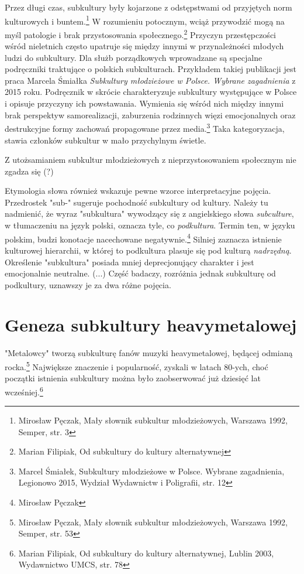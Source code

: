 \documentclass[12pt, a4paper, titlepage]{report}
\begin{document}
Przez długi czas, subkultury były kojarzone z odstępstwami od przyjętych norm kulturowych i buntem.\footnote{Mirosław Pęczak, Mały słownik subkultur młodzieżowych, Warszawa 1992, Semper, str. 3} W rozumieniu potocznym, wciąż przywodzić mogą na myśl patologie i brak przystosowania społecznego.\footnote{Marian Filipiak, Od subkultury do kultury alternatywnej} Przyczyn przestępczości wśród nieletnich często upatruje się między innymi w przynależności młodych ludzi do subkultury. Dla służb porządkowych wprowadzane są specjalne podręczniki traktujące o polskich subkulturach. Przykładem takiej publikacji jest praca Marcela Śmiałka \textit{Subkultury młodzieżowe w Polsce. Wybrane zagadnienia} z 2015 roku. Podręcznik w skrócie charakteryzuje subkultury występujące w Polsce i opisuje przyczyny ich powstawania. Wymienia się wśród nich między innymi brak perspektyw samorealizacji, zaburzenia rodzinnych więzi emocjonalnych oraz destrukcyjne formy zachowań propagowane przez media.\footnote{Marcel Śmiałek, Subkultury młodzieżowe w Polsce. Wybrane zagadnienia, Legionowo 2015, Wydział Wydawnictw i Poligrafii, str. 12} Taka kategoryzacja, stawia członków subkultur w mało przychylnym świetle. 

Z utożsamianiem subkultur młodzieżowych z nieprzystosowaniem społecznym nie zgadza się (?)

Etymologia słowa również wskazuje pewne wzorce interpretacyjne pojęcia. Przedrostek "sub-" sugeruje pochodność subkultury od kultury.   Należy tu nadmienić, że wyraz "subkultura" wywodzący się z angielskiego słowa \textit{subculture}, w tłumaczeniu na język polski, oznacza tyle, co \textit{podkultura}. Termin ten, w języku polskim, budzi konotacje nacechowane negatywnie.\footnote{Mirosław Pęczak} Silniej zaznacza istnienie kulturowej hierarchii, w której to podkultura plasuje się pod kulturą \textit{nadrzędną}. Określenie "subkultura" posiada mniej deprecjonujący charakter i jest emocjonalnie neutralne. (...) Część badaczy, rozróżnia jednak subkulturę od podkultury, uznawszy je za dwa różne pojęcia. %


\newpage
\section{Geneza subkultury heavymetalowej}
"Metalowcy" tworzą subkulturę fanów muzyki heavymetalowej, będącej odmianą rocka.\footnote{Mirosław Pęczak, Mały słownik subkultur młodzieżowych, Warszawa 1992, Semper, str. 53}  Największe znaczenie i popularność, zyskali w latach 80-ych, choć początki istnienia subkultury można było zaobserwować już dziesięć lat wcześniej.\footnote{Marian Filipiak, Od subkultury do kultury alternatywnej, Lublin 2003, Wydawnictwo UMCS, str. 78} 
\end{document}
